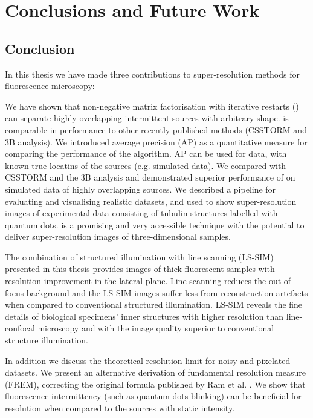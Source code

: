 \chapter{Conclusions and Future Work\label{ch:Summary}}

\section{Conclusion}

In this thesis we have made three contributions to super-resolution methods for fluorescence microscopy:

We have shown that non-negative matrix factorisation with iterative restarts (\inmf{}) can separate highly overlapping intermittent sources with arbitrary shape. \inmf{} is comparable in performance to other recently published methods (CSSTORM and 3B analysis). We introduced average precision (AP) as a quantitative measure for comparing the performance of the \inmf{} algorithm. AP can be used for data, with known true locatins of the sources (e.g. simulated data). We compared \inmf{} with CSSTORM and the 3B analysis and demonstrated superior performance of \inmf{} on simulated data of highly overlapping sources. We described a pipeline for evaluating and visualising realistic datasets, and used \inmf{} to show super-resolution images of experimental data consisting of tubulin structures labelled with quantum dots. \inmf{} is a promising and very accessible technique with the potential to deliver super-resolution images of three-dimensional samples.

The combination of structured illumination with line scanning (LS-SIM) presented in this thesis provides images of thick fluorescent samples with resolution improvement in the lateral plane. Line scanning reduces the out-of-focus background and the LS-SIM images suffer less from reconstruction artefacts when compared to conventional structured illumination. LS-SIM reveals the fine details of biological specimens' inner structures with higher resolution than line-confocal microscopy and with the image quality superior to conventional structure illumination.

In addition we discuss the theoretical resolution limit for noisy and pixelated datasets. We present an alternative derivation of fundamental resolution measure (FREM), correcting the original formula published by Ram et al. \cite{Ram2006}. We show that fluorescence intermittency (such as quantum dots blinking) can be beneficial for resolution when compared to the sources with static intensity.

